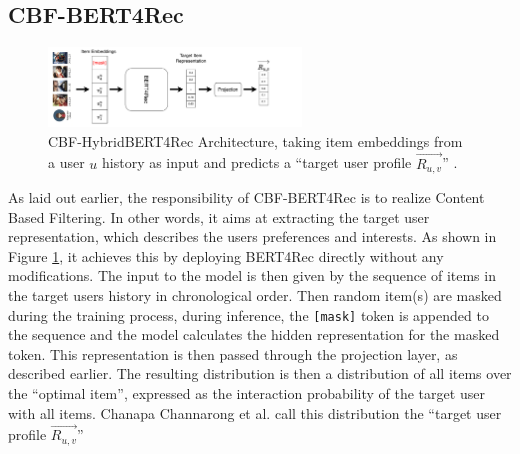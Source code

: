 \documentclass{Academic}
\begin{document}
        \subsection{CBF-BERT4Rec}
        \begin{figure}[ht!]
            \centering
            \includegraphics[width=0.6\textwidth]{images/CBF-HybridBERT4Rec.pdf}
            \caption{CBF-HybridBERT4Rec Architecture, taking item embeddings from a user $u$ history as input and predicts a \enquote{target user profile $\overrightarrow{R_{u,v}}$} \cite{channarongHybridBERT4RecHybridContentBased2022}.}
            \label{fig:cbf-arch}
        \end{figure}
        As laid out earlier, the responsibility of CBF-BERT4Rec is to realize Content Based Filtering. In other words, it aims at extracting the target user representation, which describes the users preferences and interests. As shown in Figure \ref{fig:cbf-arch}, it achieves this by deploying BERT4Rec directly without any modifications. The input to the model is then given by the sequence of items in the target users history in chronological order. Then random item(s) are masked during the training process, during inference, the \texttt{[mask]} token is appended to the sequence and the model calculates the hidden representation for the masked token. This representation is then passed through the projection layer, as described earlier. The resulting distribution is then a distribution of all items over the \enquote{optimal item}, expressed as the interaction probability of the target user with all items. Chanapa Channarong et al. \cite{channarongHybridBERT4RecHybridContentBased2022} call this distribution the \enquote{target user profile $\overrightarrow{R_{u,v}}$}
        \FloatBarrier
\end{document}
